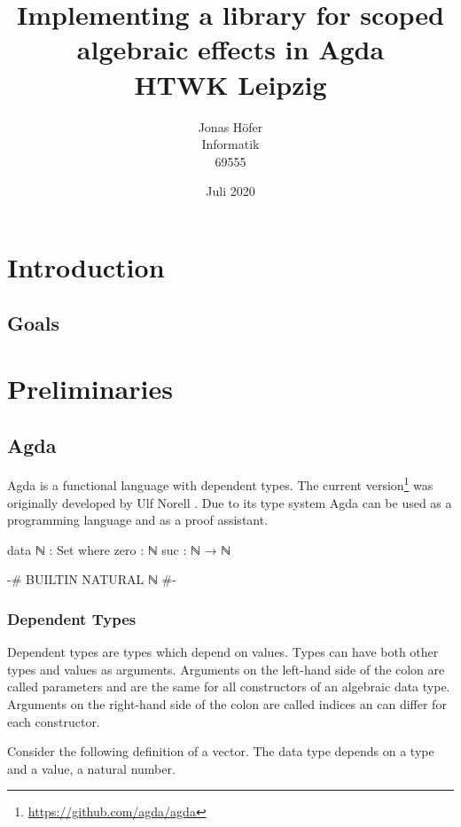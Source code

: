 \documentclass[10pt,a4paper,twoside]{report}
\title{
  {\huge\textbf{Implementing a library for scoped algebraic effects in Agda}}\\
  {\large HTWK Leipzig}
}
\author{
  {Jonas Höfer}\\
  {Informatik}\\
  {69555}
}
\date{Juli 2020}
\begin{document}
\maketitle
\begin{abstract}
\end{abstract}

\tableofcontents

\chapter{Introduction}
\section{Goals}

\chapter{Preliminaries}
\section{Agda}

Agda is a functional language with dependent types.
The current version\footnote{\url{https://github.com/agda/agda}} was originally
developed by Ulf Norell \cite{norell:thesis}.
Due to its type system Agda can be used as a programming language and as a proof
assistant.

\begin{code}
data ℕ : Set where
  zero  : ℕ
  suc   : ℕ → ℕ
\end{code}
\begin{code}[hide]
{-# BUILTIN NATURAL ℕ #-}
\end{code}

\subsection{Dependent Types}

Dependent types are types which depend on values.
Types can have both other types and values as arguments.
Arguments on the left-hand side of the colon are called parameters and are the
same for all constructors of an algebraic data type.
Arguments on the right-hand side of the colon are called indices an can differ
for each constructor.

Consider the following definition of a vector.
The data type depends on a type  and a value, a natural number.
\end{document}
